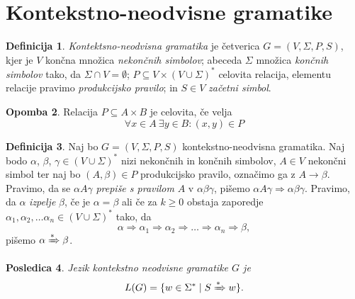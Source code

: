 \documentclass{amsart}
\theoremstyle{definition}
\newtheorem{definicija}{Definicija}[section]
\newtheorem{opomba}[definicija]{Opomba}
\theoremstyle{plain} %
\newtheorem{posledica}[definicija]{Posledica}
\begin{document}
\section{Kontekstno-neodvisne gramatike}



\begin{definicija}

    \textit{Kontektsno-neodvisna gramatika} je četverica $ G = ( V, \Sigma, P, S ) $, kjer je
    $ V $ končna množica \textit{nekončnih simbolov}; abeceda $ \Sigma $ množica \textit{končnih simbolov}
    tako, da $ \Sigma \cap V = \emptyset $; $ P \subseteq V \times ( V \cup \Sigma )^* $ celovita relacija,
    elementu relacije pravimo \textit{produkcijsko pravilo}; in $ S \in V $ \textit{začetni simbol}.

\end{definicija}

\begin{opomba}
    
    Relacija $ P \subseteq A \times B $ je celovita, če velja
    \[
        \forall x \in A \ \exists y \in B \colon (x,y) \in P
    \]

\end{opomba}

\begin{definicija}
    
    Naj bo $ G = ( V, \Sigma, P, S ) $ kontekstno-neodvisna gramatika. Naj bodo $ \alpha $,
    $ \beta $, $ \gamma \in ( V \cup \Sigma )^* $ nizi nekončnih in končnih simbolov,
    $ A \in V $ nekončni simbol ter naj bo $ ( A, \beta ) \in P $ produkcijsko pravilo,
    označimo ga z $ A \rightarrow \beta $. Pravimo, da se $ \alpha A \gamma $ 
    \textit{prepiše s pravilom} $ A $ v $ \alpha\beta\gamma $, pišemo $ \alpha A \gamma  \Rightarrow 
    \alpha\beta\gamma $. Pravimo, da $ \alpha $ \textit{izpelje} $ \beta $, če je $ \alpha = \beta $ ali če
    za $ k \geq 0 $ obstaja zaporedje $ \alpha_1, \alpha_2, \ldots \alpha_n
    \in ( V \cup \Sigma )^* $ tako, da 
    \[
        \alpha \Rightarrow \alpha_1 \Rightarrow \alpha_2 \Rightarrow \ldots \Rightarrow \alpha_n
        \Rightarrow \beta,
    \]
    pišemo $ \alpha \xRightarrow{*} \beta $.

\end{definicija}

\begin{posledica}

    Jezik kontekstno neodvisne gramatike $ G $ je
    \[
        L(G) = \{ w \in \Sigma^* \mid S \xRightarrow{*} w \}.
    \]

\end{posledica}
\end{document}
